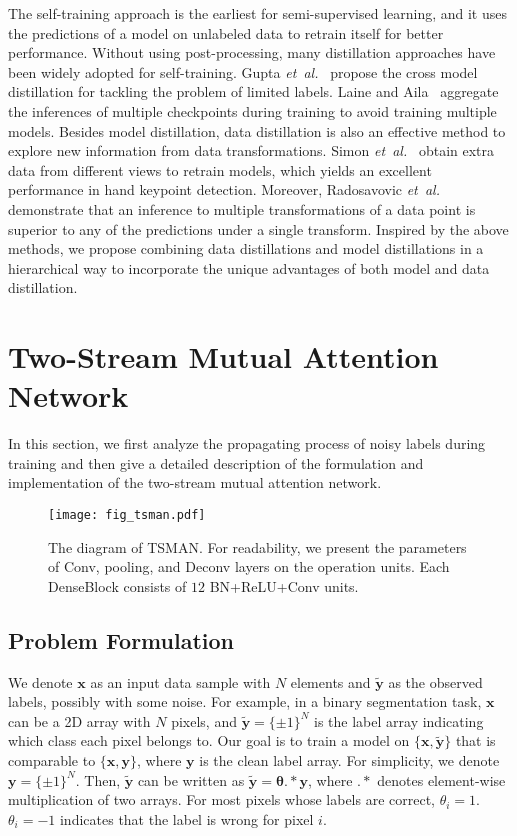 \documentclass[letterpaper]{article} %
\begin{document}
The self-training approach is the earliest for semi-supervised learning, and it uses the predictions of a model on unlabeled data to retrain itself for better performance.
Without using post-processing, many distillation approaches have been widely adopted for self-training.
Gupta \emph{et~al.}~ propose the cross model distillation for tackling the problem of limited labels.
Laine and Aila~ aggregate the inferences of multiple checkpoints during training to avoid training multiple models.
Besides model distillation, data distillation is also an effective method to explore new information from data transformations.
Simon \emph{et~al.}~ obtain extra data from different views to retrain models, which yields an excellent performance in hand keypoint detection.
Moreover, Radosavovic \emph{et~al.}~ demonstrate that an inference to multiple transformations of a data point is superior to any of the predictions under a single transform.
%
Inspired by the above methods, we propose combining data distillations and model distillations in a hierarchical way to incorporate the unique advantages of both model and data distillation.
\section{Two-Stream Mutual Attention Network}\label{sec:dan}
In this section, we first analyze the propagating process of noisy labels during training and then give a detailed description of the formulation and implementation of the two-stream mutual attention network.

\begin{figure*}[t]
	\begin{center}
		\texttt{[image: fig\_tsman.pdf]}
	\end{center}
	\caption{The diagram of TSMAN. For readability, we present the parameters of Conv, pooling, and Deconv layers on the operation units. Each DenseBlock consists of $12$ BN+ReLU+Conv units.}
	\label{fig:dan}
\end{figure*}\subsection{Problem Formulation}
We denote $\boldsymbol{x}$ as an input data sample with $N$ elements and $\tilde{\boldsymbol{y}}$ as the observed labels, possibly with some noise. For example, in a binary segmentation task, $\boldsymbol{x}$ can be a 2D array with $N$ pixels, and $\tilde{\boldsymbol{y}}=\{\pm 1\}^{N}$ is the label array indicating which class each pixel belongs to. Our goal is to train a model on $\{\boldsymbol{x},\tilde{\boldsymbol{y}}\}$ that is comparable to $\{\boldsymbol{x},\boldsymbol{y}\}$, where $\boldsymbol{y}$ is the clean label array. For simplicity, we denote $\boldsymbol{y}=\{\pm 1\}^N$. Then, $\tilde{\boldsymbol{y}}$ can be written as $\tilde{\boldsymbol{y}}=\bm{\theta}.*\boldsymbol{y}$, where $.*$ denotes element-wise multiplication of two arrays. For most pixels whose labels are correct, $\theta_i=1$. $\theta_i= -1$ indicates that the label is wrong for pixel $i$. 
\end{document}
